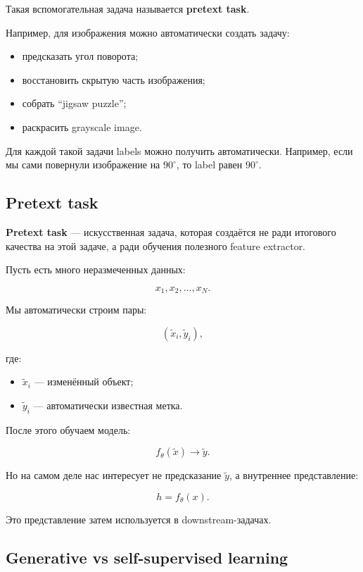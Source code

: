 \documentclass[a4paper,12pt]{article}
\begin{document}
Такая вспомогательная задача называется \textbf{pretext task}.

Например, для изображения можно автоматически создать задачу:

\begin{itemize}
    \item предсказать угол поворота;
    \item восстановить скрытую часть изображения;
    \item собрать ``jigsaw puzzle'';
    \item раскрасить grayscale image.
\end{itemize}

Для каждой такой задачи labels можно получить автоматически. Например, если мы сами повернули изображение на \(90^\circ\), то label равен \(90^\circ\).

\subsection{Pretext task}

\textbf{Pretext task} --- искусственная задача, которая создаётся не ради итогового качества на этой задаче, а ради обучения полезного feature extractor.

Пусть есть много неразмеченных данных:

\[
x_1, x_2, \dots, x_N.
\]

Мы автоматически строим пары:

\[
(\tilde{x}_i, \tilde{y}_i),
\]

где:

\begin{itemize}
    \item \(\tilde{x}_i\) --- изменённый объект;
    \item \(\tilde{y}_i\) --- автоматически известная метка.
\end{itemize}

После этого обучаем модель:

\[
f_\theta(\tilde{x}) \rightarrow \tilde{y}.
\]

Но на самом деле нас интересует не предсказание \(\tilde{y}\), а внутреннее представление:

\[
h = f_\theta(x).
\]

Это представление затем используется в downstream-задачах.

\subsection{Generative vs self-supervised learning}
\end{document}
